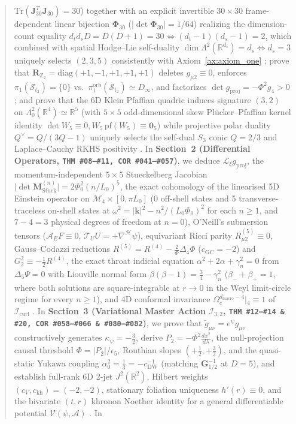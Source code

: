 \documentclass[11pt,a4paper]{article}
\newcommand{\catD}{\text{\textbf{\textcolor{blue!75!black}{[D]}}}}
\theoremstyle{definition}
\theoremstyle{plain}
\theoremstyle{remark}
\begin{document}
\begin{abstract}
$\mathrm{Tr}(\mathbf{J}_{30}^T\mathbf{J}_{30}) = 30$) together with an explicit invertible $30\times 30$ frame-dependent linear bijection $\bm{\Phi}_{30}$ ($\vert{}\det\bm{\Phi}_{30}\vert{} = 1/64$) realizing the dimension-count equality $d_t d_s D = D(D+1) = 30 \iff (d_t - 1)(d_s - 1) = 2$, which combined with spatial Hodge--Lie self-duality $\dim\Lambda^2(\mathbb{R}^{d_s}) = d_s \iff d_s = 3$ uniquely selects $(2, 3, 5)$ consistently with Axiom~\ref{ax:axiom_one} \catD; prove that $\mathbf{R}_{\mathbb{Z}_2} = \mathrm{diag}(+1,-1,+1,+1,+1)$ deletes $g_{\mu 2} \equiv 0$, enforces $\pi_1(\mathcal{S}_{t_2}) = \{0\}$ vs.\ $\pi_1^{\mathrm{orb}}(\mathcal{S}_{t_2}) \simeq D_\infty$, and factorizes $\det g_{\mathrm{proj}} = -\Phi^2 g_4 > 0$ \catD; and prove that the 6D Klein Pfaffian quadric induces signature $(3, 2)$ on $\Lambda^2_0(\mathbb{R}^4) \simeq \mathbb{R}^5$ (with $5\times 5$ odd-dimensional skew Pl\"ucker--Pfaffian kernel identity $\det W_5 \equiv 0, W_5\,\mathrm{pf}(W_5) \equiv \mathbf{0}_5$) while projective polar duality $Q^\vee = Q/(3Q - 1)$ uniquely selects the self-dual $S_3$ conic $Q = 2/3$ and Laplace--Cauchy RKHS positivity \catD. In \textbf{Section~2 (Differential Operators, \texttt{THM~\#08--\#11, COR~\#041--\#057})}, we deduce $\mathcal{L}_\xi g_{\mathrm{proj}}$, the momentum-independent $5\times 5$ Stueckelberg Jacobian $\vert{}\det\mathbf{M}_{\mathrm{St\ddot{u}ck}}^{(n)}\vert{} = 2\Phi_0^2(n/L_0)^5$, the exact cohomology of the linearised 5D Einstein operator on $\mathcal{M}_4 \times [0,\pi L_0]$ (0 off-shell states and 5 transverse-traceless on-shell states at $\omega^2 = \vert{}\mathbf{k}\vert{}^2 - n^2/(L_0\Phi_0)^2$ for each $n \ge 1$, and $7 - 4 = 3$ physical degrees of freedom at $n = 0$), O'Neill's submersion tensors ($\mathcal{A}_E F \equiv 0$, $\mathcal{T}_U U = +\nabla^{\mathcal{H}}\psi$), equivariant Ricci parity $R_{\mu 2}^{(5)} \equiv 0$, Gauss--Codazzi reductions $R^{(5)} = R^{(4)} - \frac{2}{\Phi}\Delta_4\Phi$ ($c_{\mathrm{GC}} = -2$) and $G^2_2 \equiv -\frac{1}{2}R^{(4)}$, the exact throat indicial equation $\alpha^2 + 2\alpha + \gamma_n^2 = 0$ from $\Delta_5\Psi = 0$ with Liouville normal form $\beta(\beta - 1) = \frac{3}{4} - \gamma_n^2$ ($\beta_- + \beta_+ = 1$, where both solutions are square-integrable at $r \to 0$ in the Weyl limit-circle regime for every $n \ge 1$), and 4D conformal invariance $\Omega_c^{d_{\mathrm{macro}}-4}\big\vert{}_4 \equiv 1$ of $\mathcal{I}_{\mathrm{curl}}$ \catD. In \textbf{Section~3 (Variational Master Action $\mathcal{I}_{3,2}$, \texttt{THM~\#12--\#14 \& \#20, COR~\#058--\#066 \& \#080--\#082})}, we prove that $\tilde{g}_{\mu\nu} = e^\psi g_{\mu\nu}$ constructively generates $\kappa_\psi = -\frac{3}{2}$, derive $P_2 = -\Phi^2\frac{dx^2}{d\lambda}$, the null-projection causal threshold $\Phi = \vert{}P_2\vert{}/\epsilon_5$, Routhian slopes $(+\frac{1}{2}, +\frac{3}{2})$, and the quasi-static Yukawa coupling $\alpha_0^2 = \frac{1}{3} = -c_{\mathrm{DW}}^{-1}$ (matching $\mathbf{G}_{1/2}^{-1}$ at $D = 5$), and establish full-rank 6D 2-jet $J^2(\mathbb{R}^2)$, Hilbert weights $(c_V, c_{\mathrm{kh}}) = (-2, -2)$, stationary foliation uniqueness $h'(r) \equiv 0$, and the bivariate $(t, r)$ khronon Noether identity for a general differentiable potential $\mathcal{V}(\psi,\mathcal{A})$ \catD. In 
\end{abstract}
\end{document}
